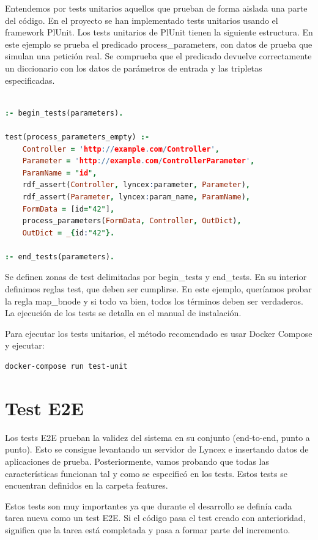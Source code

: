 \documentclass[openright,twoside,12pt]{book}
\begin{document}
Entendemos por tests unitarios aquellos que prueban de forma aislada una parte del código. En el proyecto se han implementado tests unitarios usando el framework PlUnit. Los tests unitarios de PlUnit tienen la siguiente estructura. En este ejemplo se prueba el predicado process\_parameters, con datos de prueba que simulan una petición real. Se comprueba que el predicado devuelve correctamente un diccionario con los datos de parámetros de entrada y las tripletas especificadas.

\begin{lstlisting}[language=Prolog]

:- begin_tests(parameters).

test(process_parameters_empty) :-
    Controller = 'http://example.com/Controller',
    Parameter = 'http://example.com/ControllerParameter',
    ParamName = "id",
    rdf_assert(Controller, lyncex:parameter, Parameter),
    rdf_assert(Parameter, lyncex:param_name, ParamName),
    FormData = [id="42"],
    process_parameters(FormData, Controller, OutDict),
    OutDict = _{id:"42"}.

:- end_tests(parameters).

\end{lstlisting}

Se definen zonas de test delimitadas por begin\_tests y end\_tests. En su interior definimos reglas test, que deben ser cumplirse. En este ejemplo, queríamos probar la regla map\_bnode y si todo va bien, todos los términos deben ser verdaderos. La ejecución de los tests se detalla en el manual de instalación.

Para ejecutar los tests unitarios, el método recomendado es usar Docker Compose y ejecutar:

\begin{verbatim}
docker-compose run test-unit
\end{verbatim}

\section{Test E2E}

Los tests E2E prueban la validez del sistema en su conjunto (end-to-end, punto a punto). Esto se consigue levantando un servidor de Lyncex e insertando datos de aplicaciones de prueba. Posteriormente, vamos probando que todas las características funcionan tal y como se especificó en los tests. Estos tests se encuentran definidos en la carpeta features.

Estos tests son muy importantes ya que durante el desarrollo se definía cada tarea nueva como un test E2E. Si el código pasa el test creado con anterioridad, significa que la tarea está completada y pasa a formar parte del incremento.
\end{document}
